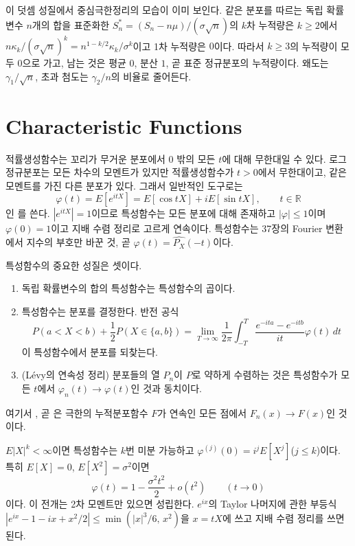 이 덧셈 성질에서 중심극한정리의 모습이 이미 보인다. 같은 분포를 따르는 독립 확률변수 $n$개의 합을 표준화한 $S_n^\ast=(S_n-n\mu)/(\sigma\sqrt n)$의 $k$차 누적량은 $k\ge2$에서 $n\kappa_k/(\sigma\sqrt n)^k=n^{1-k/2}\kappa_k/\sigma^k$이고 1차 누적량은 $0$이다. 따라서 $k\ge3$의 누적량이 모두 $0$으로 가고, 남는 것은 평균 $0$, 분산 $1$, 곧 표준 정규분포의 누적량이다. 왜도는 $\gamma_1/\sqrt n$, 초과 첨도는 $\gamma_2/n$의 비율로 줄어든다.

\section{Characteristic Functions}
\label{sec:characteristic-function}

적률생성함수는 꼬리가 무거운 분포에서 $0$ 밖의 모든 $t$에 대해 무한대일 수 있다. 로그정규분포는 모든 차수의 모멘트가 있지만 적률생성함수가 $t>0$에서 무한대이고, 같은 모멘트를 가진 다른 분포가 있다. 그래서 일반적인 도구로는
\[
\varphi(t)=E[e^{itX}]=E[\cos tX]+iE[\sin tX],\qquad t\in\mathbb R
\]
인 를 쓴다. $|e^{itX}|=1$이므로 특성함수는 모든 분포에 대해 존재하고 $|\varphi|\le1$이며 $\varphi(0)=1$이고 지배 수렴 정리로 고르게 연속이다. 특성함수는 37장의 Fourier 변환에서 지수의 부호만 바꾼 것, 곧 $\varphi(t)=\widehat{P_X}(-t)$이다.

특성함수의 중요한 성질은 셋이다.
\begin{enumerate}
\item 독립 확률변수의 합의 특성함수는 특성함수의 곱이다.
\item 특성함수는 분포를 결정한다. 반전 공식
\[
P(a<X<b)+\frac12P(X\in\{a,b\})=\lim_{T\to\infty}\frac1{2\pi}\int_{-T}^T\frac{e^{-ita}-e^{-itb}}{it}\varphi(t)\,dt
\]
이 특성함수에서 분포를 되찾는다\cite{billingsley1995}.
\item (Lévy의 연속성 정리) 분포들의 열 $P_n$이 $P$로 약하게 수렴하는 것은 특성함수가 모든 $t$에서 $\varphi_n(t)\to\varphi(t)$인 것과 동치이다\cite{billingsley1995}.
\end{enumerate}
여기서 , 곧 은 극한의 누적분포함수 $F$가 연속인 모든 점에서 $F_n(x)\to F(x)$인 것이다.

$E|X|^k<\infty$이면 특성함수는 $k$번 미분 가능하고 $\varphi^{(j)}(0)=i^jE[X^j]$($j\le k$)이다. 특히 $E[X]=0$, $E[X^2]=\sigma^2$이면
\begin{equation}
\varphi(t)=1-\frac{\sigma^2t^2}2+o(t^2)\qquad(t\to0)
\label{eq:cf-taylor}
\end{equation}
이다. 이 전개는 2차 모멘트만 있으면 성립한다. $e^{ix}$의 Taylor 나머지에 관한 부등식 $|e^{ix}-1-ix+x^2/2|\le\min(|x|^3/6,\,x^2)$을 $x=tX$에 쓰고 지배 수렴 정리를 쓰면 된다.


